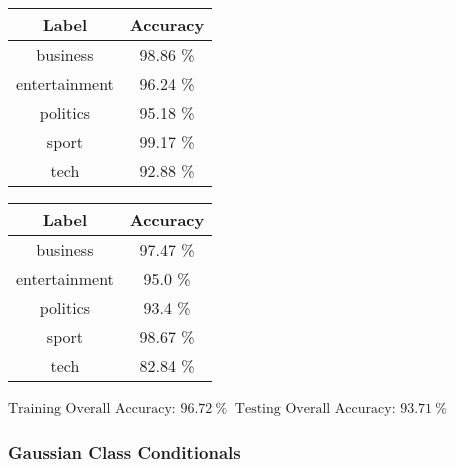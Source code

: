 \documentclass[8pt]{extarticle}
\begin{document}
    \begin{center}
        \begin{tabular}{cc}
            \hline
            Label & Accuracy\\
            \hline
            business &   98.86 \% \\
       entertainment &   96.24 \% \\
           politics  &   95.18 \% \\
              sport  &   99.17 \% \\
               tech  &   92.88 \%
         \end{tabular}
         \quad
        \begin{tabular}{cc}
            \hline
            Label & Accuracy\\
            \hline
            business &   97.47 \% \\
        entertainment &  95.0 \% \\
           politics  &   93.4 \% \\
              sport  &   98.67 \% \\
               tech  &   82.84 \%
        \end{tabular}
    \end{center}

    \begin{center}
        $\displaystyle \text{Training Overall Accuracy:\ }96.72\ \%$
        $\displaystyle \ \text{Testing Overall Accuracy:\ }93.71\ \%$
    \end{center}
    \hypertarget{gaussian-class-conditionals}{%
\newpage
\subsubsection{Gaussian Class
Conditionals}\label{gaussian-class-conditionals}}
\end{document}
